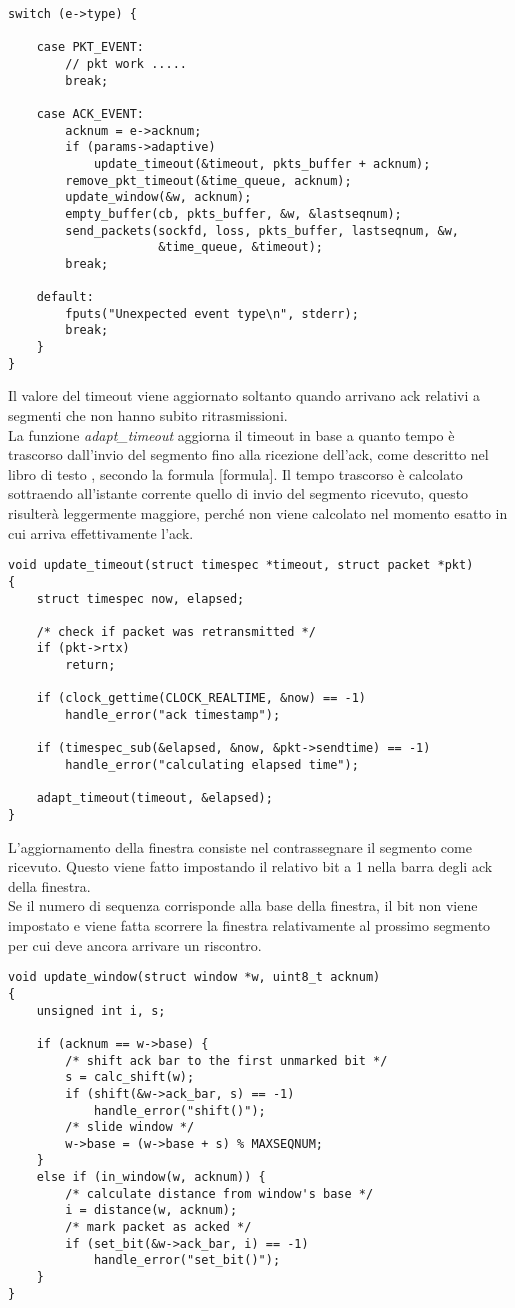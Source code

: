 %
\begin{lstlisting}[title=transport.c]
switch (e->type) {

    case PKT_EVENT:
        // pkt work .....
        break;

    case ACK_EVENT:
        acknum = e->acknum;
        if (params->adaptive)
            update_timeout(&timeout, pkts_buffer + acknum);
		remove_pkt_timeout(&time_queue, acknum);
        update_window(&w, acknum);
        empty_buffer(cb, pkts_buffer, &w, &lastseqnum);
        send_packets(sockfd, loss, pkts_buffer, lastseqnum, &w,
                     &time_queue, &timeout);
        break;

    default:
        fputs("Unexpected event type\n", stderr);
        break;
    }
}
\end{lstlisting}
Il valore del timeout viene aggiornato soltanto quando arrivano ack relativi
a segmenti che non hanno subito ritrasmissioni.\\
La funzione \emph{adapt\_timeout} aggiorna il timeout in base a quanto tempo
è trascorso dall'invio del segmento fino alla ricezione dell'ack, come
descritto nel libro di testo \cite{kurose}, secondo la formula [formula].
%
%
Il tempo trascorso è calcolato sottraendo all'istante corrente quello di invio
del segmento ricevuto, questo risulterà leggermente maggiore, perché
non viene calcolato nel momento esatto in cui arriva effettivamente l'ack.
%
\begin{lstlisting}[title=transport.c]
void update_timeout(struct timespec *timeout, struct packet *pkt)
{
    struct timespec now, elapsed;

    /* check if packet was retransmitted */
    if (pkt->rtx)
        return;

    if (clock_gettime(CLOCK_REALTIME, &now) == -1)
        handle_error("ack timestamp");

    if (timespec_sub(&elapsed, &now, &pkt->sendtime) == -1)
        handle_error("calculating elapsed time");

    adapt_timeout(timeout, &elapsed);
}
\end{lstlisting}
L'aggiornamento della finestra consiste nel contrassegnare il segmento come
ricevuto. Questo viene fatto impostando il relativo bit a 1 nella barra degli
ack della finestra.\\
Se il numero di sequenza corrisponde alla base della finestra, il bit non viene
impostato e viene fatta scorrere la finestra relativamente al prossimo segmento
per cui deve ancora arrivare un riscontro.
\begin{lstlisting}[title=window.c]
void update_window(struct window *w, uint8_t acknum)
{
    unsigned int i, s;

    if (acknum == w->base) {
        /* shift ack bar to the first unmarked bit */
        s = calc_shift(w);
        if (shift(&w->ack_bar, s) == -1)
            handle_error("shift()");
        /* slide window */
        w->base = (w->base + s) % MAXSEQNUM;
    }
    else if (in_window(w, acknum)) {
        /* calculate distance from window's base */
        i = distance(w, acknum);
        /* mark packet as acked */
        if (set_bit(&w->ack_bar, i) == -1)
            handle_error("set_bit()");
    }
}
\end{lstlisting}
